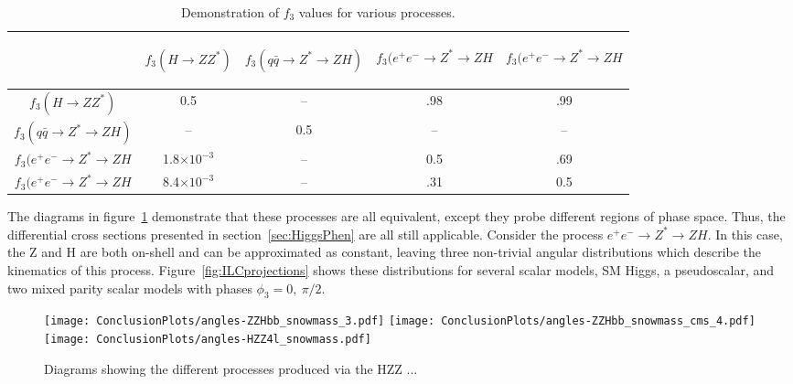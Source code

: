 \begin{table}
\begin{center}
\begin{tabular}{c|cccc}

 &\begin{rotate}{60}$f_3(H\to ZZ^*)$ \end{rotate} 
 &\begin{rotate}{60}$f_3(q\bar{q}\to Z^*\to ZH)$ \end{rotate}
 &\begin{rotate}{60}$f_3(e^+e^-\to Z^*\to ZH$ \end{rotate}
 &\begin{rotate}{60}$f_3(e^+e^-\to Z^*\to ZH$ \end{rotate} \\ \hline

$f_3(H\to ZZ^*)$             & 0.5 & -- & .98 & .99 \\
$f_3(q\bar{q}\to Z^*\to ZH)$ & -- & 0.5 & -- & -- \\
$f_3(e^+e^-\to Z^*\to ZH$    & 1.8$\times10^{-3}$ & -- & 0.5 & .69 \\
$f_3(e^+e^-\to Z^*\to ZH$    & 8.4$\times10^{-3}$ & -- & .31 & 0.5 \\
\hline
\hline

\end{tabular}
\end{center}
\label{table:fa3Conversion}
\caption{Demonstration of $f_3$ values for various processes.}
\end{table}

The diagrams in figure~\ref{fig:HZZprocesses} demonstrate that 
these 
processes are all equivalent, except they probe different 
regions of phase space.  Thus, the differential cross sections
presented in section~\ref{sec:HiggsPhen} are all still applicable. 
Consider the process $e^+e^-\to Z^*\to ZH$.  In this case, the
Z and H are both on-shell and can be approximated as constant, 
leaving three non-trivial angular distributions which describe 
the kinematics of this process. Figure~\ref{fig:ILCprojections}
shows
these distributions for several scalar models, SM Higgs, a 
pseudoscalar, and two mixed parity scalar models with 
phases $\phi_3=0,~\pi/2$.  

\begin{figure}
\begin{center}
\texttt{[image: ConclusionPlots/angles-ZZHbb\_snowmass\_3.pdf]}
\texttt{[image: ConclusionPlots/angles-ZZHbb\_snowmass\_cms\_4.pdf]}
\texttt{[image: ConclusionPlots/angles-HZZ4l\_snowmass.pdf]}
\label{fig:HZZprocesses}
\caption{Diagrams showing the different processes produced
via the HZZ ... }
\end{center}
\end{figure}

